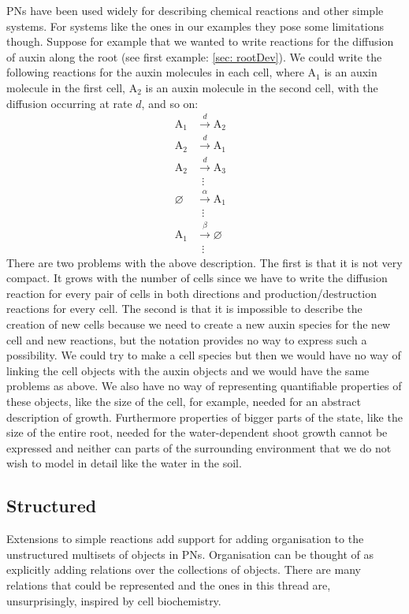 \documentclass[phd]{infthesis}
\begin{document}
PNs have been used widely for describing chemical reactions and other simple
systems. For systems like the ones in our examples they pose some limitations
though. Suppose for example that we wanted to write reactions for the diffusion
of auxin along the root (see first example: \ref{sec: rootDev}). We could write
the following reactions for the auxin molecules in each cell, where
$\mathrm{A}_1$ is an auxin molecule in the first cell, $\mathrm{A}_2$ is an
auxin molecule in the second cell, with the diffusion occurring at rate
$d$, and so on:
\begin{align*}
\mathrm{A}_1 &\xrightarrow{d} \mathrm{A}_2 \\
\mathrm{A}_2 &\xrightarrow{d} \mathrm{A}_1 \\
\mathrm{A}_2 &\xrightarrow{d} \mathrm{A}_3\\
 &  \hspace{6pt}  \vdots& \\
\varnothing & \xrightarrow{\alpha} \mathrm{A}_1 \\
 & \hspace{6pt}  \vdots &\\
\mathrm{A}_1 &\xrightarrow{\beta} \varnothing \\
  & \hspace{6pt}  \vdots 
\end{align*}
There are two problems with the above description. The first is that it is not
very compact. It grows with the number of cells since we have to write the
diffusion reaction for every pair of cells in both directions and
production/destruction reactions for every cell. The second is that it is
impossible to describe the creation of new cells because we need to create a new
auxin species for the new cell and new reactions, but the notation provides no
way to express such a possibility. We could try to make a cell species but then
we would have no way of linking the cell objects with the auxin objects and we
would have the same problems as above. We also have no way of representing
quantifiable properties of these objects, like the size of the cell, for
example, needed for an abstract description of growth. Furthermore properties of
bigger parts of the state, like the size of the entire root, needed for the
water-dependent shoot growth cannot be expressed and neither can parts of the
surrounding environment that we do not wish to model in detail like the water in
the soil.

\subsection{Structured}
\label{subsec:structLangs}
Extensions to simple reactions add support for adding organisation to the
unstructured multisets of objects in PNs. Organisation can be thought of as
explicitly adding relations over the collections of objects. There are many
relations that could be represented and the ones in this thread are,
unsurprisingly, inspired by cell biochemistry.
\end{document}
